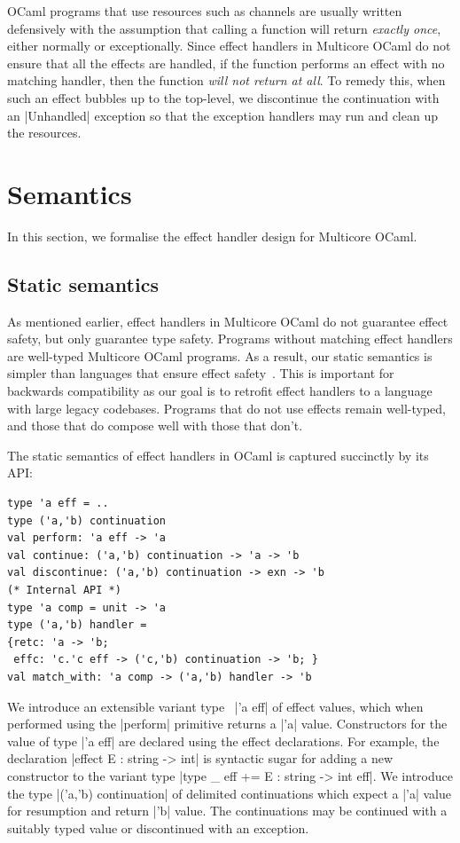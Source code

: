 \documentclass[sigplan,10pt,review,anonymous]{acmart}\settopmatter{printfolios=true,printccs=false,printacmref=false}
\begin{document}
OCaml programs that use resources such as channels are usually written defensively
with the assumption that calling a function will return \emph{exactly once},
either normally or exceptionally. Since effect handlers in Multicore OCaml do
not ensure that all the effects are handled, if the function performs an effect
with no matching handler, then the function \emph{will not return at all}. To
remedy this, when such an effect bubbles up to the top-level, we discontinue the
continuation with an |Unhandled| exception so that the exception handlers may
run and clean up the resources.

\section{Semantics}
\label{sec:semantics}

In this section, we formalise the effect handler design for Multicore OCaml.

\subsection{Static semantics}
\label{sec:static_semantics}

As mentioned earlier, effect handlers in Multicore OCaml do not guarantee
effect safety, but only guarantee type safety. Programs without matching effect
handlers are well-typed Multicore OCaml programs. As a result, our static
semantics is simpler than languages that ensure effect
safety~\cite{Eff,Hillerstrom20,Leijen14,Effekt,Frank,Biernacki19}. This is
important for backwards compatibility as our goal is to retrofit effect
handlers to a language with large legacy codebases. Programs that do not use
effects remain well-typed, and those that do compose well with those that
don't.

The static semantics of effect handlers in OCaml is captured succinctly by its
API:
\begin{lstlisting}
type 'a eff = ..
type ('a,'b) continuation
val perform: 'a eff -> 'a
val continue: ('a,'b) continuation -> 'a -> 'b
val discontinue: ('a,'b) continuation -> exn -> 'b
(* Internal API *)
type 'a comp = unit -> 'a
type ('a,'b) handler =
{retc: 'a -> 'b;
 effc: 'c.'c eff -> ('c,'b) continuation -> 'b; }
val match_with: 'a comp -> ('a,'b) handler -> 'b
\end{lstlisting}
We introduce an extensible variant type~\cite{ExtVariants} |'a eff| of effect
values, which when performed using the |perform| primitive returns a |'a|
value. Constructors for the value of type |'a eff| are declared using the
effect declarations. For example, the declaration |effect E : string -> int|
is syntactic sugar for adding a new constructor to the variant type
|type _ eff += E : string -> int eff|. We introduce the type
|('a,'b) continuation| of delimited continuations which expect a |'a| value for
resumption and return |'b| value. The continuations may be continued with a
suitably typed value or discontinued with an exception.
\end{document}
